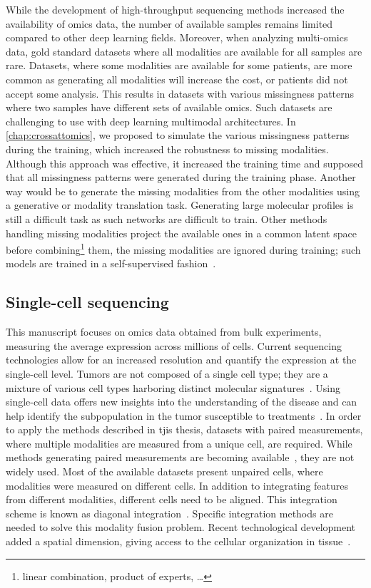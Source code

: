 \documentclass[../main.tex]{subfiles}
\begin{document}
		While the development of high-throughput sequencing methods increased the availability of omics data, the number of available samples remains limited compared to other deep learning fields.
		Moreover, when analyzing multi-omics data, gold standard datasets where all modalities are available for all samples are rare.
		Datasets, where some modalities are available for some patients, are more common as generating all modalities will increase the cost, or patients did not accept some analysis.
		This results in datasets with various missingness patterns where two samples have different sets of available omics.
		Such datasets are challenging to use with deep learning multimodal architectures.
		In \cref{chap:crossattomics}, we proposed to simulate the various missingness patterns during the training, which increased the robustness to missing modalities.
		Although this approach was effective, it increased the training time and supposed that all missingness patterns were generated during the training phase.
		Another way would be to generate the missing modalities from the other modalities using a generative or modality translation task.
		Generating large molecular profiles is still a difficult task as such networks are difficult to train.
		Other methods handling missing modalities project the available ones in a common latent space before combining\footnote{linear combination, product of experts, \dots} them, the missing modalities are ignored during training; such models are trained in a self-supervised fashion~\cite{Lee2021AVI}.

	\subsection{Single-cell sequencing}
		This manuscript focuses on omics data obtained from bulk experiments, measuring the average expression across millions of cells.
		Current sequencing technologies allow for an increased resolution and quantify the expression at the single-cell level.
		Tumors are not composed of a single cell type; they are a mixture of various cell types harboring distinct molecular signatures~\cite{TumourHetero}.
		Using single-cell data offers new insights into the understanding of the disease and can help identify the subpopulation in the tumor susceptible to treatments~\cite{DagogoJack2017}.
		In order to apply the methods described in tjis thesis, datasets with paired measurements, where multiple modalities are measured from a unique cell, are required.
		While methods generating paired measurements are becoming available~\cite{Macaulay2015,Hao2021,Vandereyken2023}, they are not widely used.
		Most of the available datasets present unpaired cells, where modalities were measured on different cells.
		In addition to integrating features from different modalities, different cells need to be aligned.
		This integration scheme is known as diagonal integration~\cite{Xu2022}.
		Specific integration methods are needed to solve this modality fusion problem.
		Recent technological development added a spatial dimension, giving access to the cellular organization in tissue~\cite{Vandereyken2023}.
		\newpage
\end{document}
